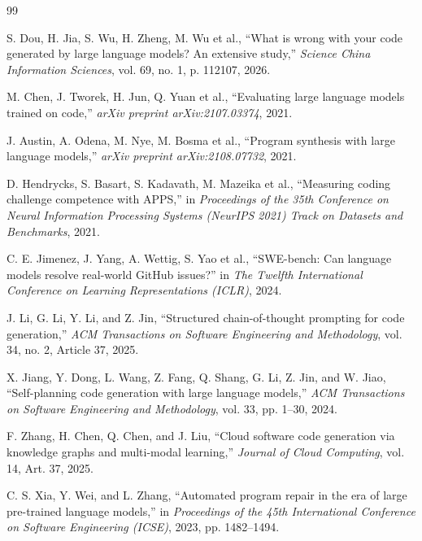 \documentclass[10pt,a4paper]{article}
\begin{document}
\begin{thebibliography}{99}
\footnotesize

S. Dou, H. Jia, S. Wu, H. Zheng, M. Wu et al., ``What is wrong with your code generated by large language models? An extensive study,'' \textit{Science China Information Sciences}, vol. 69, no. 1, p. 112107, 2026.

M. Chen, J. Tworek, H. Jun, Q. Yuan et al., ``Evaluating large language models trained on code,'' \textit{arXiv preprint arXiv:2107.03374}, 2021.

J. Austin, A. Odena, M. Nye, M. Bosma et al., ``Program synthesis with large language models,'' \textit{arXiv preprint arXiv:2108.07732}, 2021.

D. Hendrycks, S. Basart, S. Kadavath, M. Mazeika et al., ``Measuring coding challenge competence with APPS,'' in \textit{Proceedings of the 35th Conference on Neural Information Processing Systems (NeurIPS 2021) Track on Datasets and Benchmarks}, 2021.

C. E. Jimenez, J. Yang, A. Wettig, S. Yao et al., ``SWE-bench: Can language models resolve real-world GitHub issues?'' in \textit{The Twelfth International Conference on Learning Representations (ICLR)}, 2024.

J. Li, G. Li, Y. Li, and Z. Jin, ``Structured chain-of-thought prompting for code generation,'' \textit{ACM Transactions on Software Engineering and Methodology}, vol. 34, no. 2, Article 37, 2025.

X. Jiang, Y. Dong, L. Wang, Z. Fang, Q. Shang, G. Li, Z. Jin, and W. Jiao, ``Self-planning code generation with large language models,'' \textit{ACM Transactions on Software Engineering and Methodology}, vol. 33, pp. 1--30, 2024.

F. Zhang, H. Chen, Q. Chen, and J. Liu, ``Cloud software code generation via knowledge graphs and multi-modal learning,'' \textit{Journal of Cloud Computing}, vol. 14, Art. 37, 2025.

C. S. Xia, Y. Wei, and L. Zhang, ``Automated program repair in the era of large pre-trained language models,'' in \textit{Proceedings of the 45th International Conference on Software Engineering (ICSE)}, 2023, pp. 1482--1494.


\end{thebibliography}
\end{document}
